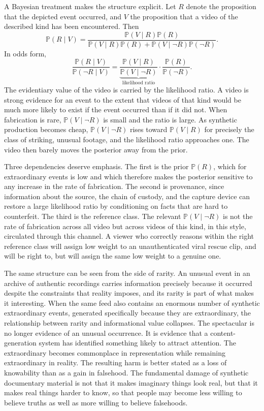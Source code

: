 \documentclass[12pt]{article}
\theoremstyle{plain}
\theoremstyle{definition}
\theoremstyle{remark}
\renewcommand{\Pr}{\mathbb{P}}
\begin{document}
A Bayesian treatment makes the structure explicit. Let $R$ denote the proposition that the depicted event occurred, and $V$ the proposition that a video of the described kind has been encountered. Then
\[
\Pr(R \mid V)
=
\frac{\Pr(V \mid R)\Pr(R)}
{\Pr(V \mid R)\Pr(R) + \Pr(V \mid \neg R)\Pr(\neg R)}.
\]
In odds form,
\[
\frac{\Pr(R \mid V)}{\Pr(\neg R \mid V)}
=
\underbrace{\frac{\Pr(V \mid R)}{\Pr(V \mid \neg R)}}_{\text{likelihood ratio}}
\cdot
\frac{\Pr(R)}{\Pr(\neg R)} .
\]
The evidentiary value of the video is carried by the likelihood ratio. A video is strong evidence for an event to the extent that videos of that kind would be much more likely to exist if the event occurred than if it did not. When fabrication is rare, $\Pr(V \mid \neg R)$ is small and the ratio is large. As synthetic production becomes cheap, $\Pr(V \mid \neg R)$ rises toward $\Pr(V \mid R)$ for precisely the class of striking, unusual footage, and the likelihood ratio approaches one. The video then barely moves the posterior away from the prior.

Three dependencies deserve emphasis. The first is the prior $\Pr(R)$, which for extraordinary events is low and which therefore makes the posterior sensitive to any increase in the rate of fabrication. The second is provenance, since information about the source, the chain of custody, and the capture device can restore a large likelihood ratio by conditioning on facts that are hard to counterfeit. The third is the reference class. The relevant $\Pr(V \mid \neg R)$ is not the rate of fabrication across all video but across videos of this kind, in this style, circulated through this channel. A viewer who correctly reasons within the right reference class will assign low weight to an unauthenticated viral rescue clip, and will be right to, but will assign the same low weight to a genuine one.

The same structure can be seen from the side of rarity. An unusual event in an archive of authentic recordings carries information precisely because it occurred despite the constraints that reality imposes, and its rarity is part of what makes it interesting. When the same feed also contains an enormous number of synthetic extraordinary events, generated specifically because they are extraordinary, the relationship between rarity and informational value collapses. The spectacular is no longer evidence of an unusual occurrence. It is evidence that a content-generation system has identified something likely to attract attention. The extraordinary becomes commonplace in representation while remaining extraordinary in reality. The resulting harm is better stated as a loss of knowability than as a gain in falsehood. The fundamental damage of synthetic documentary material is not that it makes imaginary things look real, but that it makes real things harder to know, so that people may become less willing to believe truths as well as more willing to believe falsehoods.
\end{document}
